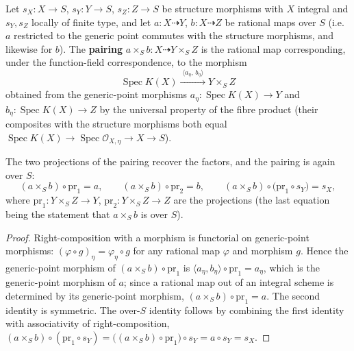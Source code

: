 \begin{definition}\leanok
  \label{def:rationalMap_prod}
  Let \(s_X \colon X \to S\), \(s_Y \colon Y \to S\), \(s_Z \colon Z \to S\) be structure
  morphisms with \(X\) integral and \(s_Y, s_Z\) locally of finite type, and let
  \(a \colon X \dashrightarrow Y\), \(b \colon X \dashrightarrow Z\) be rational maps over
  \(S\) (i.e.\ \(a\) restricted to the generic point commutes with the structure morphisms,
  and likewise for \(b\)). The \textbf{pairing} \(a \times_S b \colon X \dashrightarrow
  Y \times_S Z\) is the rational map corresponding, under the function-field correspondence,
  to the morphism
  \[
    \operatorname{Spec} K(X)
    \xrightarrow{\;\langle a_\eta,\, b_\eta \rangle\;}
    Y \times_S Z
  \]
  obtained from the generic-point morphisms \(a_\eta \colon \operatorname{Spec} K(X) \to Y\)
  and \(b_\eta \colon \operatorname{Spec} K(X) \to Z\) by the universal property of the fibre
  product (their composites with the structure morphisms both equal
  \(\operatorname{Spec} K(X) \to \operatorname{Spec}\mathcal O_{X,\eta} \to X \to S\)).
\end{definition}

\begin{lemma}\leanok
  \label{lem:rationalMap_prod_proj}
  The two projections of the pairing recover the factors, and the pairing is again over
  \(S\):
  \[
    (a \times_S b) \circ \mathrm{pr}_1 = a,
    \qquad
    (a \times_S b) \circ \mathrm{pr}_2 = b,
    \qquad
    (a \times_S b) \circ \bigl(\mathrm{pr}_1 \circ s_Y\bigr) = s_X,
  \]
  where \(\mathrm{pr}_1 \colon Y \times_S Z \to Y\), \(\mathrm{pr}_2 \colon Y \times_S Z \to Z\)
  are the projections (the last equation being the statement that \(a \times_S b\) is over
  \(S\)).
\end{lemma}
\begin{proof}\leanok
  Right-composition with a morphism is functorial on generic-point morphisms:
  \((\varphi \circ g)_\eta = \varphi_\eta \circ g\) for any rational map \(\varphi\) and
  morphism \(g\). Hence the generic-point morphism of \((a \times_S b) \circ \mathrm{pr}_1\) is
  \(\langle a_\eta, b_\eta\rangle \circ \mathrm{pr}_1 = a_\eta\), which is the generic-point
  morphism of \(a\); since a rational map out of an integral scheme is determined by its
  generic-point morphism, \((a \times_S b) \circ \mathrm{pr}_1 = a\). The second identity is
  symmetric. The over-\(S\) identity follows by combining the first identity with
  associativity of right-composition, \((a \times_S b) \circ (\mathrm{pr}_1 \circ s_Y) =
  \bigl((a \times_S b) \circ \mathrm{pr}_1\bigr) \circ s_Y = a \circ s_Y = s_X\).
\end{proof}

